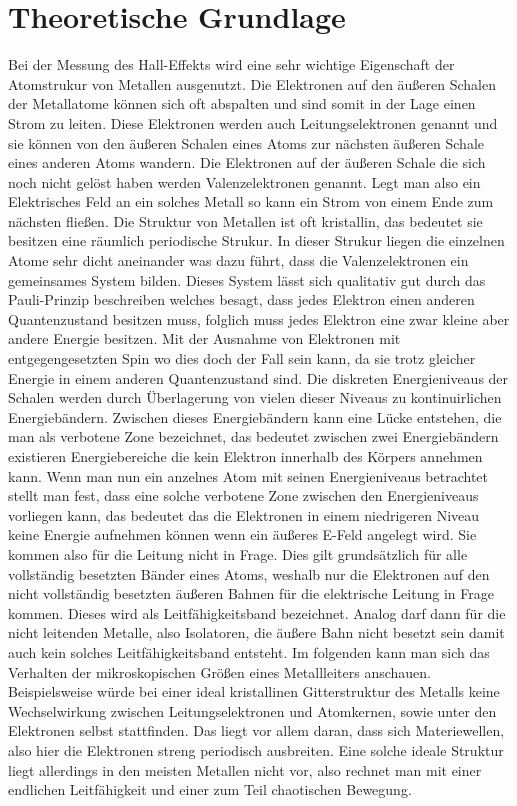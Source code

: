 \section{Theoretische Grundlage}
\label{sec:theo}
Bei der Messung des Hall-Effekts wird eine sehr wichtige Eigenschaft der Atomstrukur von Metallen ausgenutzt. %
Die Elektronen auf den äußeren Schalen der Metallatome können sich oft abspalten und sind somit in der Lage
einen Strom zu leiten. Diese Elektronen werden auch Leitungselektronen genannt und sie können von den äußeren Schalen
eines Atoms zur nächsten äußeren Schale eines anderen Atoms wandern. Die Elektronen auf der äußeren Schale die sich noch nicht gelöst haben werden Valenzelektronen
genannt. Legt man also ein Elektrisches Feld an ein solches Metall so kann ein Strom von einem Ende zum nächsten fließen.
Die Struktur von Metallen ist oft kristallin, das bedeutet sie besitzen eine räumlich periodische Strukur. In dieser Strukur liegen die einzelnen Atome sehr dicht aneinander 
was dazu führt, dass die Valenzelektronen ein gemeinsames System bilden. Dieses System lässt sich qualitativ gut durch das Pauli-Prinzip beschreiben welches besagt, dass
jedes Elektron einen anderen Quantenzustand besitzen muss, folglich muss jedes Elektron eine zwar kleine aber andere Energie besitzen. Mit der Ausnahme von Elektronen
mit entgegengesetzten Spin wo dies doch der Fall sein kann, da sie trotz gleicher Energie in einem anderen Quantenzustand sind. Die diskreten Energieniveaus der Schalen
werden durch Überlagerung von vielen dieser Niveaus zu kontinuirlichen Energiebändern. Zwischen dieses Energiebändern kann eine Lücke entstehen, die man 
als verbotene Zone bezeichnet, das bedeutet zwischen zwei Energiebändern existieren Energiebereiche die kein Elektron innerhalb des Körpers annehmen kann.
Wenn man nun ein anzelnes Atom mit seinen Energieniveaus betrachtet stellt man fest, dass eine solche verbotene Zone zwischen den Energieniveaus vorliegen kann, das bedeutet
das die Elektronen in einem niedrigeren Niveau keine Energie aufnehmen können wenn ein äußeres E-Feld angelegt wird. Sie kommen also für die Leitung nicht in Frage. 
Dies gilt grundsätzlich für alle vollständig besetzten Bänder eines Atoms, weshalb nur die Elektronen auf den nicht vollständig
besetzten äußeren Bahnen für die elektrische Leitung in Frage kommen. Dieses wird als Leitfähigkeitsband bezeichnet.
Analog darf dann für die nicht leitenden Metalle, also Isolatoren, die äußere Bahn nicht besetzt sein damit auch kein solches Leitfähigkeitsband entsteht.
Im folgenden kann man sich das Verhalten der mikroskopischen Größen eines Metallleiters anschauen.
Beispielsweise würde bei einer ideal kristallinen Gitterstruktur des Metalls keine Wechselwirkung zwischen Leitungselektronen und Atomkernen, sowie unter den Elektronen
selbst stattfinden. Das liegt vor allem daran, dass sich Materiewellen, also hier die Elektronen streng periodisch ausbreiten. 
Eine solche ideale Struktur liegt allerdings in den meisten Metallen nicht vor, also rechnet man mit einer endlichen Leitfähigkeit und einer zum Teil chaotischen Bewegung.

